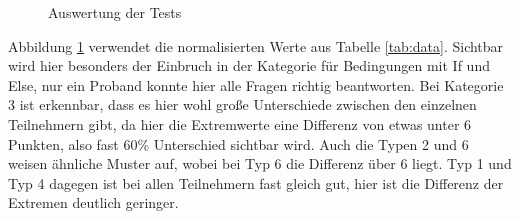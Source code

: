 	
	\begin{figure}[H]
		\centering
		\caption[Auswertung]{Auswertung der Tests}
		\label{img:auswertung}
	\end{figure}
	
	Abbildung \ref{img:auswertung} verwendet die normalisierten Werte aus Tabelle \ref{tab:data}. Sichtbar wird hier besonders der Einbruch in der Kategorie für Bedingungen mit If und Else, nur ein Proband konnte hier alle Fragen richtig beantworten. Bei Kategorie 3 ist erkennbar, dass es hier wohl große Unterschiede zwischen den einzelnen Teilnehmern gibt, da hier die Extremwerte eine Differenz von etwas unter 6 Punkten, also fast 60\% Unterschied sichtbar wird. Auch die Typen 2 und 6 weisen ähnliche Muster auf, wobei bei Typ 6 die Differenz über 6 liegt. Typ 1 und Typ 4 dagegen ist bei allen Teilnehmern fast gleich gut, hier ist die Differenz der Extremen deutlich geringer.\\ 

